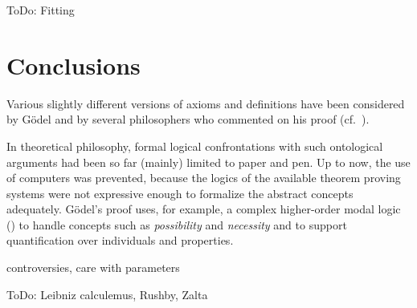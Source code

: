 \documentclass{birkjour}
\newtheorem{thm}{Theorem}[section]
\theoremstyle{definition}
\newtheorem{defn}[thm]{Definition}
\theoremstyle{remark}
\numberwithin{equation}{section}
\def\HOML{\entity{HOML}\xspace}
\begin{document}
ToDo: Fitting


\section{Conclusions}


Various slightly different versions of
axioms and definitions have been considered by G\"{o}del and by
several philosophers who commented on his proof
(cf.~\cite{sobel2004logic,anderson90:_some_emend_of_goedel_ontol_proof,AndersonGettings,Fitting,Adams,ContemporaryBibliography}).



In theoretical philosophy, formal logical confrontations with such
ontological arguments had been so far (mainly) limited to paper
and pen.  Up to now, the use of computers was prevented, because the
logics of the available theorem proving systems were not expressive
enough to formalize the abstract concepts adequately. G{\"o}del's proof
uses, for example, a complex higher-order modal logic (\HOML) to handle
concepts such as \emph{possibility} and \emph{necessity} and to support
quantification over individuals and properties.

controversies, care with parameters

ToDo: Leibniz calculemus, Rushby, Zalta \cite{oppenheimera11,rushby13}





\end{document}
